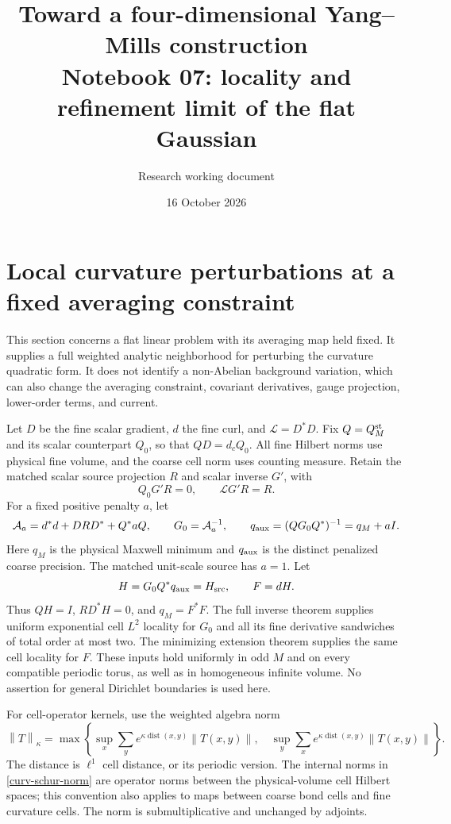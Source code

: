\documentclass[11pt]{article}
\title{Toward a four-dimensional Yang--Mills construction\\
\large Notebook 07: locality and refinement limit of the flat Gaussian}
\author{Research working document}
\date{16 October 2026}
\theoremstyle{remark}
\newcommand{\norm}[1]{\left\|#1\right\|}
\begin{document}
\section{Local curvature perturbations at a fixed averaging constraint}
\label{curv-section}

This section concerns a flat linear problem with its averaging map held
fixed. It supplies a full weighted analytic neighborhood for perturbing
the curvature quadratic form. It does not identify a non-Abelian
background variation, which can also change the averaging constraint,
covariant derivatives, gauge projection, lower-order terms, and current.

Let $D$ be the fine scalar gradient, $d$ the fine curl, and
$\mathcal L=D^*D$. Fix $Q=Q_M^{\rm st}$ and its scalar counterpart
$Q_0$, so that $QD=d_cQ_0$. All fine Hilbert norms use physical fine
volume, and the coarse cell norm uses counting measure. Retain the
matched scalar source projection $R$ and scalar inverse $G'$, with
\begin{equation}\label{curv-scalar-identities}
 Q_0G'R=0,\qquad \mathcal L G'R=R.
\end{equation}
For a fixed positive penalty $a$, let
\begin{equation}\label{curv-fine-data}
 \mathcal A_a=d^*d+DRD^*+Q^*aQ,\qquad G_0=\mathcal A_a^{-1},
 \qquad q_{\rm aux}=(QG_0Q^*)^{-1}=q_M+aI.
\end{equation}
Here $q_M$ is the physical Maxwell minimum and $q_{\rm aux}$ is the
distinct penalized coarse precision. The matched unit-scale source
has $a=1$. Let
\begin{equation}\label{curv-extension}
 H=G_0Q^*q_{\rm aux}=H_{\rm src},\qquad F=dH.
\end{equation}
Thus $QH=I$, $RD^*H=0$, and $q_M=F^*F$.
The full inverse theorem supplies uniform exponential cell $L^2$
locality for $G_0$ and all its fine derivative sandwiches of total
order at most two. The minimizing extension theorem supplies the same
cell locality for $F$. These inputs hold uniformly in odd $M$ and on
every compatible periodic torus, as well as in homogeneous infinite
volume. No assertion for general Dirichlet boundaries is used here.

For cell-operator kernels, use the weighted algebra norm
\begin{equation}\label{curv-schur-norm}
 \norm{T}_\kappa=
 \max\left\{\sup_x\sum_y e^{\kappa\operatorname{dist}(x,y)}
                  \norm{T(x,y)},\quad
             \sup_y\sum_x e^{\kappa\operatorname{dist}(x,y)}
                  \norm{T(x,y)}\right\}.
\end{equation}
The distance is $\ell^1$ cell distance, or its periodic version.
The internal norms in \eqref{curv-schur-norm} are operator norms
between the physical-volume cell Hilbert spaces; this convention
also applies to maps between coarse bond cells and fine curvature
cells. The norm is submultiplicative and unchanged by adjoints.
\end{document}
